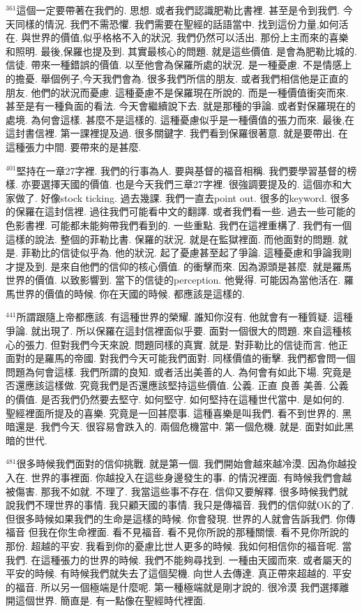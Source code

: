 \documentclass{book}
\begin{document}
$^{361}$這個一定要帶著在我們的.
思想.
或者我們認識肥勒比書裡.
甚至是令到我們.
今天同樣的情況.
我們不需恐懼.
我們需要在聖經的話語當中.
找到這份力量,如何活在.
與世界的價值,似乎格格不入的狀況.
我們仍然可以活出.
那份上主而來的喜樂和照明.
最後,保羅也提及到.
其實最核心的問題.
就是這些價值.
是會為肥勒比城的.
信徒.
帶來一種錯誤的價值.
以至他會為保羅所處的狀況.
是一種憂慮.
不是情感上的擔憂.
舉個例子,今天我們會為.
很多我們所信的朋友.
或者我們相信他是正直的朋友.
他們的狀況而憂慮.
這種憂慮不是保羅現在所說的.
而是一種價值衝突而來.
甚至是有一種負面的看法.
今天會繼續說下去.
就是那種的爭論.
或者對保羅現在的處境.
為何會這樣.
甚麼不是這樣的.
這種憂慮似乎是一種價值的張力而來.
最後,在這封書信裡.
第一課裡提及過.
很多關鍵字.
我們看到保羅很著意.
就是要帶出.
在這種張力中間.
要帶來的是甚麼.

$^{401}$堅持在一章27字裡.
我們的行事為人.
要與基督的福音相稱.
我們要學習基督的榜樣.
亦要選擇天國的價值.
也是今天我們三章27字裡.
很強調要提及的.
這個亦和大家做了.
好像stock ticking.
過去幾課.
我們一直去point out.
很多的keyword.
很多的保羅在這封信裡.
過往我們可能看中文的翻譯.
或者我們看一些.
過去一些可能的色影書裡.
可能都未能夠帶我們看到的.
一些重點.
我們在這裡重構了.
我們有一個這樣的說法.
整個的菲勒比書.
保羅的狀況.
就是在監獄裡面.
而他面對的問題.
就是.
菲勒比的信徒似乎為.
他的狀況.
起了憂慮甚至起了爭論.
這種憂慮和爭論我剛才提及到.
是來自他們的信仰的核心價值.
的衝擊而來.
因為源頭是甚麼.
就是羅馬世界的價值.
以致影響到.
當下的信徒的perception.
他覺得.
可能因為當他活在.
羅馬世界的價值的時候.
你在天國的時候.
都應該是這樣的.

$^{441}$所謂跟隨上帝都應該.
有這種世界的榮耀.
誰知你沒有.
他就會有一種質疑.
這種爭論.
就出現了.
所以保羅在這封信裡面似乎要.
面對一個很大的問題.
來自這種核心的張力.
但對我們今天來說.
問題同樣的真實.
就是.
對菲勒比的信徒而言.
他正面對的是羅馬的帝國.
對我們今天可能我們面對.
同樣價值的衝擊.
我們都會問一個問題為何會這樣.
我們所謂的良知.
或者活出美善的人.
為何會有如此下場.
究竟是否還應該這樣做.
究竟我們是否還應該堅持這些價值.
公義.
正直 良善 美善.
公義的價值.
是否我們仍然要去堅守.
如何堅守.
如何堅持在這種世代當中.
是如何的.
聖經裡面所提及的喜樂.
究竟是一回甚麼事.
這種喜樂是叫我們.
看不到世界的.
黑暗還是.
我們今天.
很容易會跌入的.
兩個危機當中.
第一個危機.
就是.
面對如此黑暗的世代.

$^{481}$很多時候我們面對的信仰挑戰.
就是第一個.
我們開始會越來越冷漠.
因為你越投入在.
世界的事裡面.
你越投入在這些身邊發生的事.
的情況裡面.
有時候我們會越被傷害.
那我不如就.
不理了.
我當這些事不存在.
信仰又要解釋.
很多時候我們就說我們不理世界的事情.
我只顧天國的事情.
我只是傳福音.
我們的信仰就OK的了.
但很多時候如果我們的生命是這樣的時候.
你會發現.
世界的人就會告訴我們.
你傳福音 但我在你生命裡面.
看不見福音.
看不見你所說的那種關懷.
看不見你所說的那份.
超越的平安.
我看到你的憂慮比世人更多的時候.
我如何相信你的福音呢.
當我們.
在這種張力的世界的時候.
我們不能夠尋找到.
一種由天國而來.
或者屬天的平安的時候.
有時候我們就失去了這個契機.
向世人去傳達.
真正帶來超越的.
平安的福音.
所以另一個極端是什麼呢.
第一種極端就是剛才說的.
很冷漠 我們選擇離開這個世界.
簡直是.
有一點像在聖經時代裡面.
\end{document}
